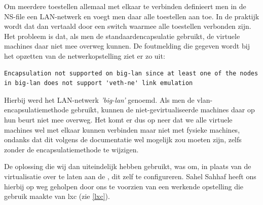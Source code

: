 Om meerdere toestellen allemaal met elkaar te verbinden definieert men in de NS-file een LAN-netwerk en voegt men daar alle toestellen aan toe.
In de praktijk wordt dat dan vertaald door een switch waarmee alle toestellen verbonden zijn.
Het probleem is dat, als men de standaardencapsulatie gebruikt, de virtuele machines daar niet mee overweg kunnen.
De foutmelding die gegeven wordt bij het opzetten van de netwerkopstelling ziet er zo uit:

\begin{lstlisting}
Encapsulation not supported on big-lan since at least one of the nodes in big-lan does not support 'veth-ne' link emulation
\end{lstlisting}

Hierbij werd het LAN-netwerk \textit{'big-lan'} genoemd.
Als men de vlan-encapsulatiemethode gebruikt, kunnen de niet-gevirtualiseerde machines daar op hun beurt niet mee overweg.
Het komt er dus op neer dat we alle virtuele machines wel met elkaar kunnen verbinden maar niet met fysieke machines,
ondanks dat dit volgens de documentatie wel mogelijk zou moeten zijn, zelfs zonder de encapsulatiemethode te wijzigen\cite{vwall-openvz}.

De oplossing die wij dan uiteindelijk hebben gebruikt, was om,
in plaats van de virtualisatie over te laten aan de \vwall{}, dit zelf te configureren.
Sahel Sahhaf heeft ons hierbij op weg geholpen door ons te voorzien van een werkende opstelling die gebruik maakte van \gls{lxc} (zie \cref{lxc}).


